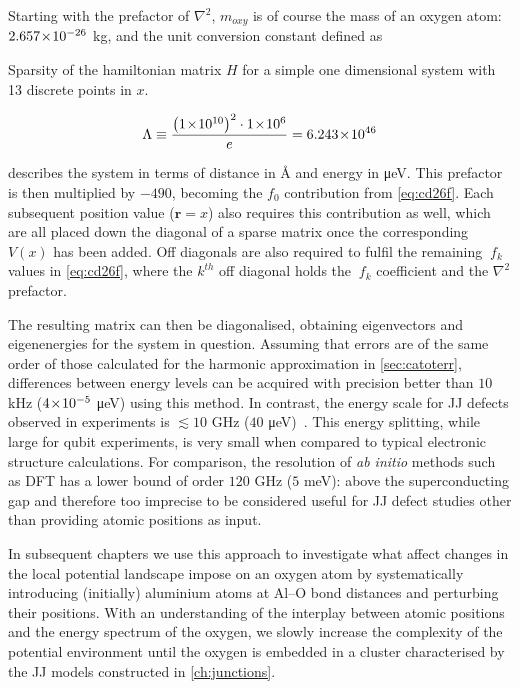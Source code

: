 Starting with the prefactor of $\nabla^2$, $m_{oxy}$ is of course the mass of an oxygen atom: $2.657\!\times\!10^{-26}$ kg, and the unit conversion constant defined as
\begin{marginfigure}
\resizebox{\marginparwidth}{!}{}
\caption[Sparsity of the Hamiltonian Matrix $H$]{Sparsity of the hamiltonian matrix $H$ for a simple one dimensional system with 13 discrete points in $x$.}
\end{marginfigure}
\begin{equation}
    \Lambda \equiv \frac{\left(1\!\times\!10^{10}\right)^2\cdot1\!\times\!10^{6}}{e} = 6.243\!\times\!10^{46}\label{eq:lambda}
\end{equation}

describes the system in terms of distance in Å and energy in μeV.
This prefactor is then multiplied by $-490$, becoming the $f_0$ contribution from \cref{eq:cd26f}.
Each subsequent position value ($\mathbf{r}=x$) also requires this contribution as well, which are all placed down the diagonal of a sparse matrix once the corresponding $V(x)$ has been added.
Off diagonals are also required to fulfil the remaining $~f_k$ values in \cref{eq:cd26f}, where the $k^{th}$ off diagonal holds the $~f_k$ coefficient and the  $\nabla^2$ prefactor.

The resulting matrix can then be diagonalised, obtaining eigenvectors and eigenenergies for the system in question.
Assuming that errors are of the same order of those calculated for the harmonic approximation in \cref{sec:catoterr}, differences between energy levels can be acquired with precision better than $10$ kHz ($4\!\times\!10^{-5}$ μeV) using this method.
In contrast, the energy scale for JJ defects observed in experiments is $\lesssim 10$ GHz ($40$ μeV)~\cite{Neeley2008, Lupascu2009, Lisenfeld2010}.
This energy splitting, while large for qubit experiments, is very small when compared to typical electronic structure calculations.
For comparison, the resolution of \textit{ab initio} methods such as DFT has a lower bound of order $120$ GHz ($5$ meV): above the superconducting gap and therefore too imprecise to be considered useful for JJ defect studies other than providing atomic positions as input.

In subsequent chapters we use this approach to investigate what affect changes in the local potential landscape impose on an oxygen atom by systematically introducing (initially) aluminium atoms at Al--O bond distances and perturbing their positions.
With an understanding of the interplay between atomic positions and the energy spectrum of the oxygen, we slowly increase the complexity of the potential environment until the oxygen is embedded in a cluster characterised by the JJ models constructed in \cref{ch:junctions}.
